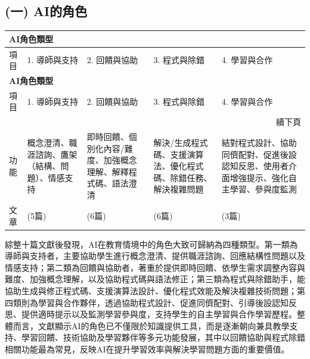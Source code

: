 \subsection{(一) AI的角色}\label{sec:AI角色}

\begin{longtable}{p{} p{} p{} p{} p{}}
\toprule
\multicolumn{5}{l}{\textbf{AI角色類型}} \\
\midrule
項目 & 1. 導師與支持 & 2. 回饋與協助 & 3. 程式與除錯 & 4. 學習與合作 \\
\midrule
\endfirsthead
\toprule
\multicolumn{5}{l}{\textbf{AI角色類型}} \\
\midrule
項目 & 1. 導師與支持 & 2. 回饋與協助 & 3. 程式與除錯 & 4. 學習與合作 \\
\midrule
\endhead
\midrule
\multicolumn{5}{r}{續下頁} \\
\endfoot
\bottomrule
\endlastfoot
功能 & 概念澄清、職涯諮詢、鷹架（結構、問題）、情感支持 & 即時回饋、個別化內容/難度、加強概念理解、解釋程式碼、語法澄清 & 解決/生成程式碼、支援演算法、優化程式碼、除錯任務、解決複雜問題 & 結對程式設計、協助同儕配對、促進後設認知反思、使用者介面增強提示、強化自主學習、參與度監測 \\
文章 & \cite{cao2023chatbots,yan2025llm,kohen2025integrating,tang2025enhancing,cubillos2025generative} (5篇) & \cite{fan2025pair,llerena2024introductory,omeh2025pbl,kohen2025integrating,yang2025chatgpt,tang2025enhancing} (6篇) & \cite{fan2025pair,groothuijsen2024chatbots,llerena2024introductory,omeh2025pbl,kohen2025integrating,yang2025chatgpt} (6篇) & \cite{fan2025pair,omeh2025pbl,kohen2025integrating} (3篇) \\
\end{longtable}

綜整十篇文獻後發現，AI在教育情境中的角色大致可歸納為四種類型。第一類為導師與支持者，主要協助學生進行概念澄清、提供職涯諮詢、回應結構性問題以及情感支持；第二類為回饋與協助者，著重於提供即時回饋、依學生需求調整內容與難度、加強概念理解，以及協助程式碼與語法修正；第三類為程式與除錯助手，能協助生成與修正程式碼、支援演算法設計、優化程式效能及解決複雜技術問題；第四類則為學習與合作夥伴，透過協助程式設計、促進同儕配對、引導後設認知反思、提供適時提示以及監測學習參與度，支持學生的自主學習與合作學習歷程。整體而言，文獻顯示AI的角色已不僅限於知識提供工具，而是逐漸朝向兼具教學支持、學習回饋、技術協助及學習夥伴等多元功能發展，其中以回饋協助與程式除錯相關功能最為常見，反映AI在提升學習效率與解決學習問題方面的重要價值。

